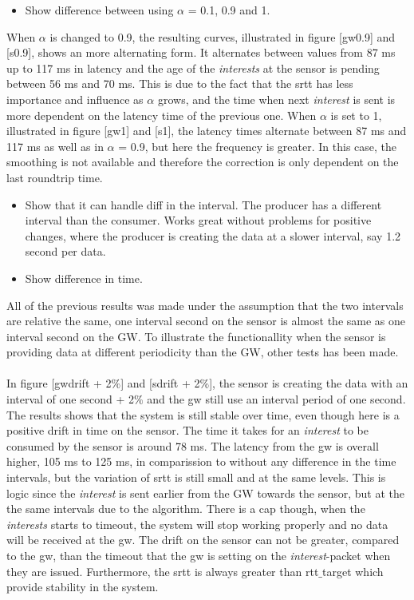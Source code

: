 \begin{itemize}
\item Show difference between using $\alpha$ = 0.1, 0.9 and 1.
\end{itemize}
When $\alpha$ is changed to 0.9, the resulting curves, illustrated in figure [gw0.9] and [s0.9], shows an more alternating form. It alternates between values from 87 ms up to 117 ms in latency and the age of the \textit{interests} at the sensor is pending between 56 ms and 70 ms. This is due to the fact that the srtt has less importance and influence as $\alpha$ grows, and the time when next \textit{interest} is sent is more dependent on the latency time of the previous one. 
When $\alpha$ is set to 1, illustrated in figure [gw1] and [s1], the latency times alternate between 87 ms and 117 ms as well as in $\alpha$ = 0.9, but here the frequency is greater. In this case, the smoothing is not available and therefore the correction is only dependent on the last roundtrip time. 





\begin{itemize}
\item Show that it can handle diff in the interval. The producer has a different interval than the consumer. Works great without problems for positive changes, where the producer is creating the data at a slower interval, say 1.2 second per data.
\item Show difference in time. 
\end{itemize}
All of the previous results was made under the assumption that the two intervals are relative the same, one interval second on the sensor is almost the same as one interval second on the GW. To illustrate the functionallity when the sensor is providing data at different periodicity than the GW, other tests has been made.\\\\
In figure [gwdrift + 2$\%$] and [sdrift + 2$\%$], the sensor is creating the data with an interval of one second + 2$\%$ and the gw still use an interval period of one second. 
The results shows that the system is still stable over time, even though here is a positive drift in time on the sensor. The time it takes for an \textit{interest} to be consumed by the sensor is around 78 ms. The latency from the gw is overall higher, 105 ms to 125 ms, in comparission to without any difference in the time intervals, but the variation of srtt is still small and at the same levels. This is logic since the \textit{interest} is sent earlier from the GW towards the sensor, but at the the same intervals due to the algorithm. There is a cap though, when the \textit{interests} starts to timeout, the system will stop working properly and no data will be received at the gw. The drift on the sensor can not be greater, compared to the gw, than the timeout that the gw is setting on the \textit{interest}-packet when they are issued. Furthermore, the srtt is always greater than rtt$\_$target which provide stability in the system.


